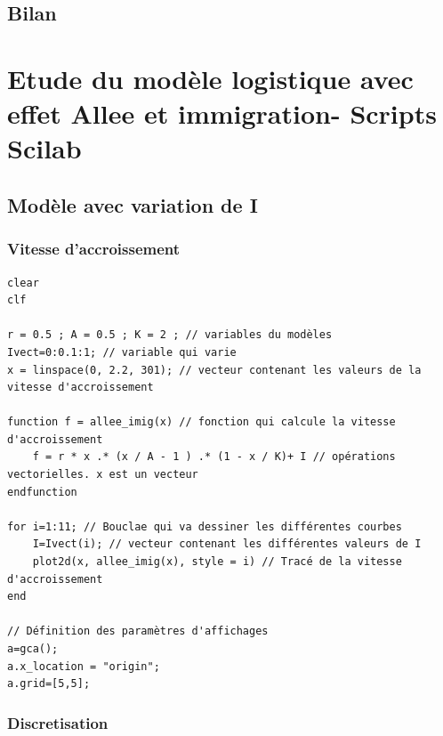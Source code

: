\documentclass{article}
\begin{document}
\subsection{Bilan}
\paragraph{}


\newpage
\appendix

\section{Etude du modèle logistique avec effet Allee et immigration- Scripts Scilab}

\subsection{Modèle avec variation de I}

\subsubsection{Vitesse d'accroissement}

\begin{verbatim}
clear
clf

r = 0.5 ; A = 0.5 ; K = 2 ; // variables du modèles
Ivect=0:0.1:1; // variable qui varie
x = linspace(0, 2.2, 301); // vecteur contenant les valeurs de la vitesse d'accroissement

function f = allee_imig(x) // fonction qui calcule la vitesse d'accroissement
    f = r * x .* (x / A - 1 ) .* (1 - x / K)+ I // opérations vectorielles. x est un vecteur
endfunction

for i=1:11; // Bouclae qui va dessiner les différentes courbes
    I=Ivect(i); // vecteur contenant les différentes valeurs de I
    plot2d(x, allee_imig(x), style = i) // Tracé de la vitesse d'accroissement
end

// Définition des paramètres d'affichages
a=gca();
a.x_location = "origin";
a.grid=[5,5];
\end{verbatim}

\subsubsection{Discretisation}
\end{document}
